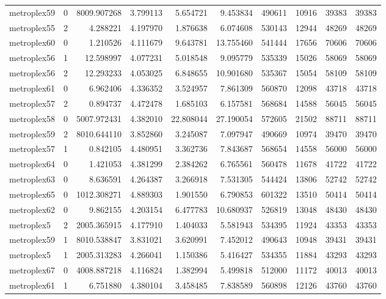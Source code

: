 \begin{longtable}{|l|r|r|r|r|r|r|r|r|r|}
metroplex59 & 0 & 8009.907268 & 3.799113 & 5.654721 & 9.453834 & 490611 & 10916 & 39383 & 39383 \\
metroplex55 & 2 & 4.288221 & 4.197970 & 1.876638 & 6.074608 & 530143 & 12944 & 48269 & 48269 \\
metroplex60 & 0 & 1.210526 & 4.111679 & 9.643781 & 13.755460 & 541444 & 17656 & 70606 & 70606 \\
metroplex56 & 1 & 12.598997 & 4.077231 & 5.018548 & 9.095779 & 535339 & 15026 & 58069 & 58069 \\
metroplex56 & 2 & 12.293233 & 4.053025 & 6.848655 & 10.901680 & 535367 & 15054 & 58109 & 58109 \\
metroplex61 & 0 & 6.962406 & 4.336352 & 3.524957 & 7.861309 & 560870 & 12098 & 43718 & 43718 \\
metroplex57 & 2 & 0.894737 & 4.472478 & 1.685103 & 6.157581 & 568684 & 14588 & 56045 & 56045 \\
metroplex58 & 0 & 5007.972431 & 4.382010 & 22.808044 & 27.190054 & 572605 & 21502 & 88711 & 88711 \\
metroplex59 & 2 & 8010.644110 & 3.852860 & 3.245087 & 7.097947 & 490669 & 10974 & 39470 & 39470 \\
metroplex57 & 1 & 0.842105 & 4.480951 & 3.362736 & 7.843687 & 568654 & 14558 & 56000 & 56000 \\
metroplex64 & 0 & 1.421053 & 4.381299 & 2.384262 & 6.765561 & 560478 & 11678 & 41722 & 41722 \\
metroplex63 & 0 & 8.636591 & 4.264387 & 3.266918 & 7.531305 & 544424 & 13806 & 52742 & 52742 \\
metroplex65 & 0 & 1012.308271 & 4.889303 & 1.901550 & 6.790853 & 601322 & 13510 & 50414 & 50414 \\
metroplex62 & 0 & 9.862155 & 4.203154 & 6.477783 & 10.680937 & 526819 & 13048 & 48430 & 48430 \\
metroplex5 & 2 & 2005.365915 & 4.177910 & 1.404033 & 5.581943 & 534395 & 11924 & 43353 & 43353 \\
metroplex59 & 1 & 8010.538847 & 3.831021 & 3.620991 & 7.452012 & 490643 & 10948 & 39431 & 39431 \\
metroplex5 & 1 & 2005.313283 & 4.266041 & 1.150386 & 5.416427 & 534355 & 11884 & 43293 & 43293 \\
metroplex67 & 0 & 4008.887218 & 4.116824 & 1.382994 & 5.499818 & 512000 & 11172 & 40013 & 40013 \\
metroplex61 & 1 & 6.751880 & 4.380104 & 3.458485 & 7.838589 & 560898 & 12126 & 43760 & 43760 \\

\end{longtable}
